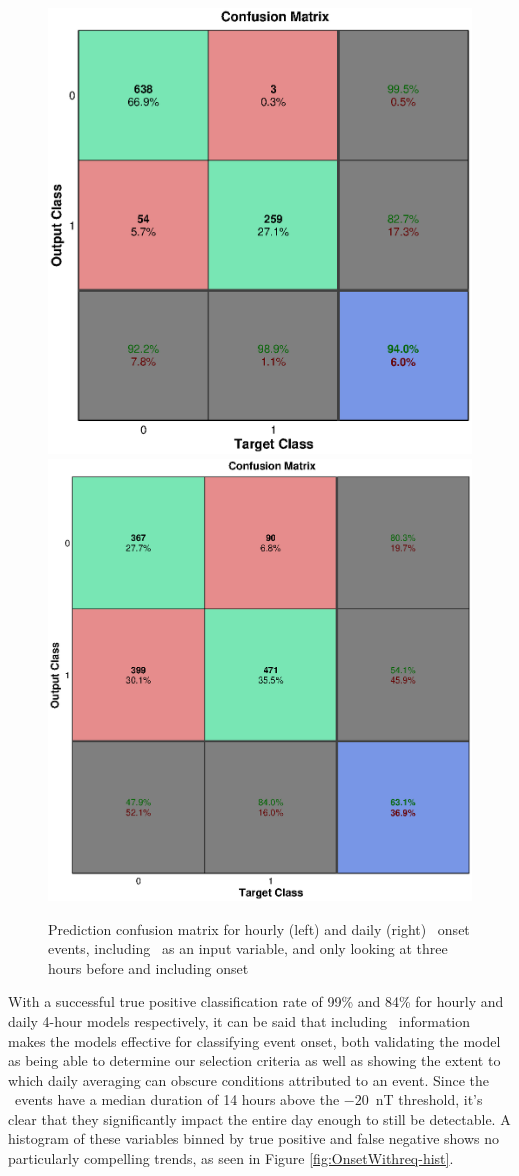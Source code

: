 \begin{figure}[htp!]
	\centering
	\includegraphics[width=0.45\linewidth]{Figures/CH5/NNBinaryOnset-hourly-withreq.eps}
	\includegraphics[width=0.45\linewidth]{Figures/CH5/NNBinaryOnset-daily-withreq.eps}
	\caption{Prediction confusion matrix for hourly (left) and daily (right) \req\ onset events, including \req\ as an input variable, and only looking at three hours before and including onset}
	\label{fig:OnsetWithreq}
\end{figure}

With a successful true positive classification rate of 99\% and 84\% for hourly and daily 4-hour models respectively, it can be said that including \req\ information makes the models effective for classifying event onset, both validating the model as being able to determine our selection criteria as well as showing the extent to which daily averaging can obscure conditions attributed to an event. Since the \req\ events have a median duration of 14 hours above the $-20$~nT threshold, it's clear that they significantly impact the entire day enough to still be detectable. A histogram of these variables binned by true positive and false negative shows no particularly compelling trends, as seen in Figure \ref{fig:OnsetWithreq-hist}.


